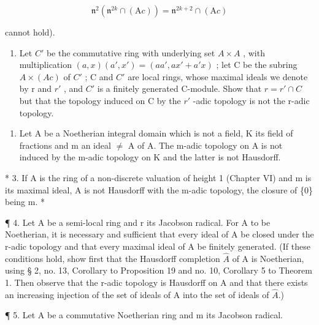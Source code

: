 \[
\mathfrak {n} ^ {2} (\mathfrak {n} ^ {2 k} \cap (\mathrm{A} c)) = \mathfrak {n} ^ {2 k + 2} \cap (\mathrm{A} c)
\]

cannot hold).

\begin{enumerate}
\def\labelenumi{(\alph{enumi})}
\setcounter{enumi}{1}
\tightlist
\item
  Let \(C'\) be the commutative ring with underlying set \(A \times A\) , with multiplication \((a, x)(a', x') = (aa', ax' + a'x)\) ; let C be the subring \(A \times (Ac)\) of \(C'\) ; C and \(C'\) are local rings, whose maximal ideals we denote by r and \(r'\) , and \(C'\) is a finitely generated C-module. Show that \(r = r' \cap C\) but that the topology induced on C by the \(r'\) -adic topology is not the r-adic topology.
\end{enumerate}

\begin{enumerate}
\def\labelenumi{\arabic{enumi}.}
\setcounter{enumi}{1}
\tightlist
\item
  Let A be a Noetherian integral domain which is not a field, K its field of fractions and m an ideal \(\neq\) A of A. The m-adic topology on A is not induced by the m-adic topology on K and the latter is not Hausdorff.
\end{enumerate}

* 3. If A is the ring of a non-discrete valuation of height 1 (Chapter VI) and m is its maximal ideal, A is not Hausdorff with the m-adic topology, the closure of \{0\} being m. *

¶ 4. Let A be a semi-local ring and r its Jacobson radical. For A to be Noetherian, it is necessary and sufficient that every ideal of A be closed under the r-adic topology and that every maximal ideal of A be finitely generated. (If these conditions hold, show first that the Hausdorff completion \(\hat{A}\) of A is Noetherian, using § 2, no. 13, Corollary to Proposition 19 and no. 10, Corollary 5 to Theorem 1. Then observe that the r-adic topology is Hausdorff on A and that there exists an increasing injection of the set of ideals of A into the set of ideals of \(\hat{A}\).)

¶ 5. Let A be a commutative Noetherian ring and m its Jacobson radical.

